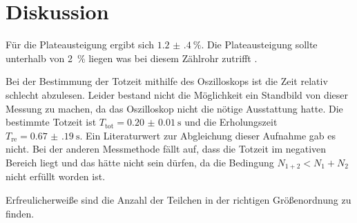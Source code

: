 \section{Diskussion}
Für die Plateausteigung ergibt sich $\SI{1.2(4)}{\%}$. Die Plateausteigung sollte
unterhalb von \SI{2}{\%} liegen was bei diesem Zählrohr zutrifft \cite{2}.

Bei der Bestimmung der Totzeit mithilfe des Oszilloskops ist die Zeit relativ schlecht abzulesen.
Leider bestand nicht die Möglichkeit ein Standbild von dieser Messung zu machen, da das Oszilloskop nicht die nötige
Ausstattung hatte. Die bestimmte Totzeit ist $T_\text{tot} = \SI{0.20(1)}{\second}$
und die Erholungszeit $T_\text{re} = \SI{0.67(19)}{\second}$.
Ein Literaturwert zur Abgleichung dieser Aufnahme gab es nicht.
Bei der anderen Messmethode fällt auf, dass die Totzeit im negativen Bereich liegt und das hätte nicht sein dürfen,
da die Bedingung $N_{1+2} < N_1 + N_2$ nicht erfüllt worden ist.

Erfreulicherweiße sind die Anzahl der Teilchen in der richtigen Größenordnung zu finden.
